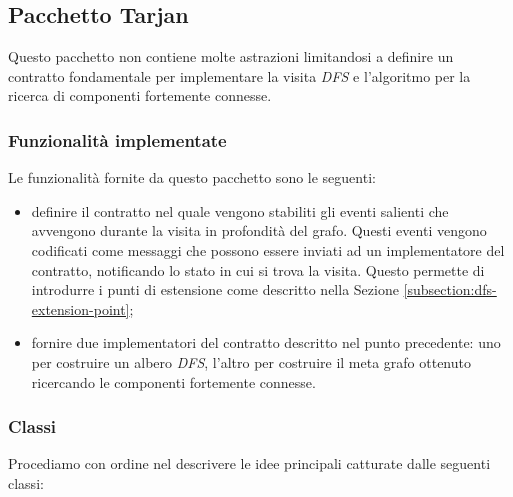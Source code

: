 \subsection{Pacchetto Tarjan}
\label{subsection:tarjan-package-description}
Questo pacchetto non contiene molte astrazioni limitandosi a definire un
contratto fondamentale per implementare la visita \emph{DFS} e
l'algoritmo per la ricerca di componenti fortemente connesse.

\subsubsection*{Funzionalit\`a implementate}
Le funzionalit\`a fornite da questo pacchetto sono le seguenti:
\begin{itemize}
\item definire il contratto nel quale vengono stabiliti gli eventi
  salienti che avvengono durante la visita in profondit\`a del
  grafo. Questi eventi vengono codificati come messaggi che possono
  essere inviati ad un implementatore del contratto, notificando lo
  stato in cui si trova la visita. Questo permette di introdurre i
  punti di estensione come descritto nella Sezione
  \ref{subsection:dfs-extension-point};
\item fornire due implementatori del contratto descritto nel punto
  precedente: uno per costruire un albero \emph{DFS}, l'altro per
  costruire il meta grafo ottenuto ricercando le componenti fortemente
  connesse.
\end{itemize}

\subsubsection*{Classi}
Procediamo con ordine nel descrivere le idee principali catturate
dalle seguenti classi:

